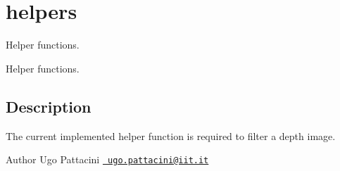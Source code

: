 \section{helpers}
\label{group__helpers}


Helper functions.  


Helper functions. 

\hypertarget{group__skeletonViewer_intro_sec}{}\subsection{Description}\label{group__skeletonViewer_intro_sec}
The current implemented helper function is required to filter a depth image.

\begin{DoxyAuthor}{Author}
Ugo Pattacini \href{mailto:ugo.pattacini@iit.it}{\texttt{ ugo.\+pattacini@iit.\+it}} 
\end{DoxyAuthor}
